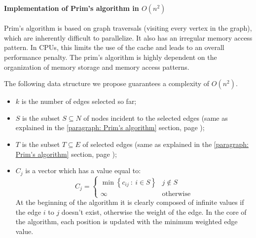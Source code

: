 \paragraph{Implementation of Prim's algorithm in $O\left(n^{2}\right)$}

Prim's algorithm is based on graph traversals (visiting every vertex in the graph), which are inherently difficult to parallelize. It also has an irregular memory access pattern. In CPUs, this limits the use of the cache and leads to an overall performance penalty. The prim's algorithm is highly dependent on the organization of memory storage and memory access patterns.\cite{10.1007/978-3-642-38853-8_14}

\highspace
The following data structure we propose guarantees a complexity of $O\left(n^{2}\right)$.
\begin{itemize}
    \item $k$ is the number of edges selected so far;

    \item $S$ is the subset $S \subseteq N$ of nodes incident to the selected edges (same as explained in the \ref{paragraph: Prim's algorithm} section, page \pageref{paragraph: Prim's algorithm});
    
    \item $T$ is the subset $T \subseteq E$ of selected edges (same as explained in the \ref{paragraph: Prim's algorithm} section, page \pageref{paragraph: Prim's algorithm});
    
    \item $C_{j}$ is a vector which has a value equal to:
    \begin{equation*}
        C_{j} = \begin{cases}
            \min\left\{c_{ij} \: : \: i \in S\right\} & j \notin S \\
            \infty & \text{otherwise}
        \end{cases}
    \end{equation*}
    At the beginning of the algorithm it is clearly composed of infinite values if the edge $i$ to $j$ doesn't exist, otherwise the weight of the edge. In the core of the algorithm, each position is updated with the minimum weighted edge value.
    

\end{itemize}
